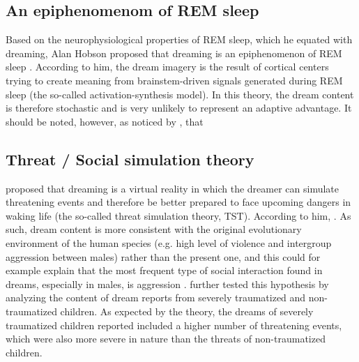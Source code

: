 \subsection{An epiphenomenom of REM sleep}
\label{sec:dream-func:modern:nofunc}

Based on the neurophysiological properties of REM sleep, which he equated with dreaming, Alan Hobson proposed that dreaming is an epiphenomenon of REM sleep \citep{hobson_dream_1998}. According to him, the dream imagery is the result of cortical centers trying to create meaning from brainstem-driven signals generated during REM sleep (the so-called activation-synthesis model). In this theory, the dream content is therefore stochastic and is very unlikely to represent an adaptive advantage. It should be noted, however, as noticed by \citet{windt_dreaming:_2015}, that 

\subsection{Threat / Social simulation theory}
\label{sec:dream-func:modern:revonsuo}

\citet{revonsuo_reinterpretation_2000} proposed that dreaming is a virtual reality in which the dreamer can simulate threatening events and therefore be better prepared to face upcoming dangers in waking life (the so-called threat simulation theory, TST). According to him,  \citep{valli_threat_2005}. As such, dream content is more consistent with the original evolutionary environment of the human species (e.g. high level of violence and intergroup aggression between males) rather than the present one, and this could for example explain that the most frequent type of social interaction found in dreams, especially in males, is aggression \citep{hall_content_1966}. \citet{valli_threat_2005} further tested this hypothesis by analyzing the content of dream reports from severely traumatized and non-traumatized children. As expected by the theory, the dreams of severely traumatized children reported included a higher number of threatening events, which were also more severe in nature than the threats of non-traumatized children.

